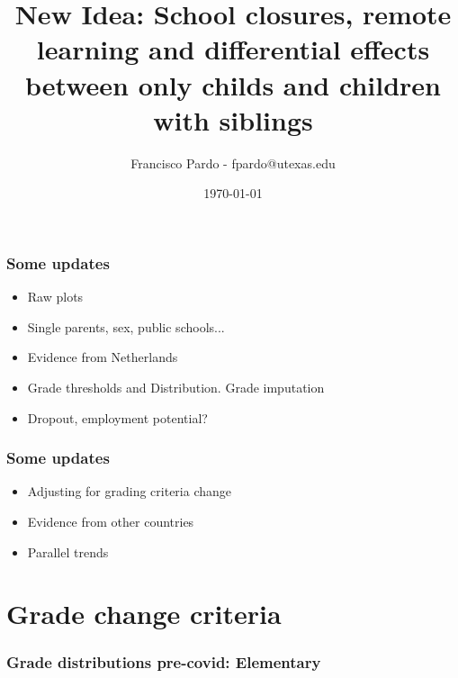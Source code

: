\documentclass{beamer}
\title[]{New Idea: School closures, remote learning and differential effects between only childs and children with siblings}
\author[Francisco Pardo] %
{Francisco Pardo - fpardo@utexas.edu \inst{1}}
\institute[UT] %
{
  \inst{1}%
  University of Texas at Austin
}
\date{\today}
\begin{document}
\frame{\titlepage}


\begin{frame}
    \label{update_scott}
    \frametitle{Some updates}
    \begin{itemize}
        \item Raw plots
        \item Single parents, sex, public schools...
        \item Evidence from Netherlands
        \item Grade thresholds and Distribution. Grade imputation
        \item Dropout, employment potential?
    \end{itemize}
\end{frame}



\begin{frame}
    \label{update_scott}
    \frametitle{Some updates}
    \begin{itemize}
        \item Adjusting for grading criteria change
        \item Evidence from other countries
        \item Parallel trends
    \end{itemize}
\end{frame}


\section{Grade change criteria}

\begin{frame}
    \label{update_scott}
    \frametitle{Grade distributions pre-covid: Elementary}
 {
    }
\end{frame}
\end{document}
